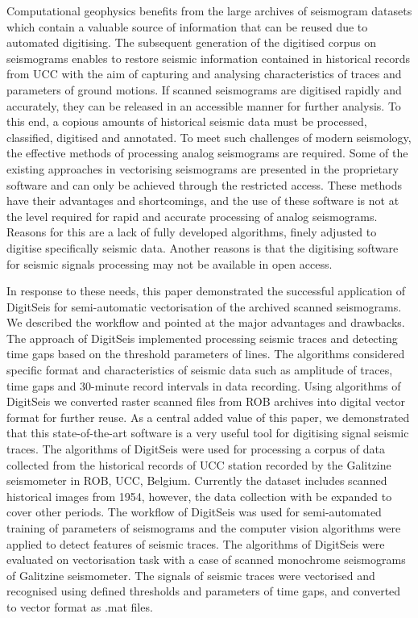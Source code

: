 \documentclass[sensors,article,accept,moreauthors,pdftex]{Definitions/mdpi}
\begin{document}
{Computational} geophysics {benefits from the large archives of }seismogram datasets {which contain a }valuable source of information that can be reused due to automated digitising. The subsequent generation of the digitised corpus on seismograms{ enables }to restore seismic information contained in historical records from  {UCC} {with the aim of capturing and analysing} characteristics of traces and parameters of ground motions. If scanned seismograms are digitised rapidly and accurately, they can be released in an accessible manner for further analysis. {To this end, }a copious amounts of historical seismic data must be processed, classified, digitised and annotated. To meet{ such }challenges {of modern seismology, the }effective {methods of }processing analog seismograms are{ required. }Some of the existing approaches in vectorising seismograms are presented in the proprietary software and can only be achieved through {the }restricted access. These methods have their advantages and shortcomings, and the use of these software is not at the level required for rapid and accurate processing of analog seismograms. Reasons for this are a lack of fully developed{ }algorithms, finely adjusted to digitise specifically seismic data{. Another reasons is that }the{ }digitising software for {seismic }signals processing may not be {available in open access}. 

{In response to these needs, this paper demonstrated }the successful {application } of DigitSeis for semi-automatic vectorisation of the archived scanned seismograms. \linebreak We described the workflow and pointed at {the major }advantages and drawbacks. The approach of DigitSeis implemented{ processing }seismic traces and detecting time gaps based on the threshold parameters{ of lines}. {The algorithms }considered specific format and characteristics of seismic data{ such as }amplitude of traces, time gaps{ and }30-minute record intervals{ in data recording. }Using algorithms of DigitSeis we converted raster scanned files from ROB archives into digital vector format for further reuse. As a central added value of this paper, we demonstrated that {this  state-of-the-art} software is a {very useful tool} for digitising signal seismic traces{. The algorithms of DigitSeis were used for processing a }corpus of data{ collected from the }historical records {of } {UCC} station recorded by the Galitzine seismometer { in}  {ROB},  {UCC}, Belgium. Currently the dataset {includes scanned historical images from }1954, however, the data collection with be expanded{ to }cover {other }periods.{ The workflow of DigitSeis was used for semi-automated training of parameters of seismograms and the computer vision algorithms were applied to detect features of seismic traces. The algorithms of }DigitSeis {were evaluated on vectorisation task with a case of }scanned monochrome seismograms of Galitzine seismometer.{ The }signals of seismic traces {were vectorised and }recognised using defined thresholds and parameters of time gaps, and{ }converted {to }vector{ format as }.mat {files}. 
\end{document}
